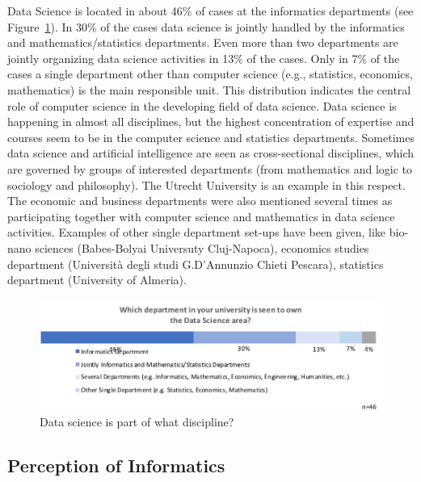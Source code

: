 Data Science is located in about 46\% of cases at the informatics departments (see Figure~\ref{sect4:discipline}). In 30\% of the cases data science is jointly handled by the informatics and mathematics/statistics departments. Even more than two departments are jointly organizing data science activities in 13\% of the cases. Only in 7\% of the cases a single department other than computer science (e.g., statistics, economics, mathematics) is the main responsible unit. This distribution indicates the central role of computer science in the developing field of data science. Data science is happening in almost all disciplines, but the highest concentration of expertise and courses seem to be in the computer science and statistics departments. Sometimes data science and artificial intelligence are seen as cross-sectional disciplines, which are governed by groups of interested departments (from mathematics and logic to sociology and philosophy). The Utrecht University is an example in this respect. The economic and business departments were also mentioned several times as participating together with computer science and mathematics in data science activities. Examples of other single department set-ups have been given, like bio-nano sciences (Babes-Bolyai Universuty Cluj-Napoca), economics studies department (Universit\`a degli studi G.D’Annunzio Chieti Pescara), statistics department (University of Almeria).

\begin{figure}[h]
\centering
\includegraphics[width = \linewidth]{charts/4a.jpg}
\caption{Data science is part of what discipline?}
\label{sect4:discipline}
\end{figure}

\subsection{Perception of Informatics}

